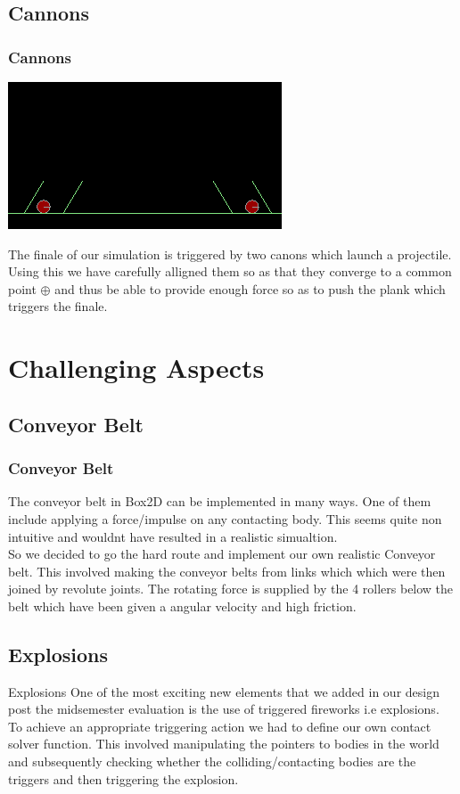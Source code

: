 \subsection{Cannons}
\begin{frame}
  \frametitle{Cannons}
  \begin{center}
  \includegraphics[scale=0.25]{./Images/Cannon00.png}
  \end{center}
The finale of our simulation is triggered by two canons which launch a projectile. Using this we have carefully alligned them so as that they converge to a common point $\oplus$ and thus be able to provide enough force so as to push the plank which triggers the finale.
\end{frame} 


\section{Challenging Aspects}
\subsection{Conveyor Belt}
\begin{frame}
\frametitle{Conveyor Belt}
The conveyor belt in Box2D can be implemented in many ways. \pause One of them include applying a force/impulse on any contacting body. \pause This seems quite non intuitive and wouldnt have resulted in a realistic simualtion. 
\\ 
\pause
So we decided to go the hard route and implement our own realistic Conveyor belt. This involved making the conveyor belts from links which which were then joined by revolute joints. The rotating force is supplied by the 4 rollers below the belt which have been given a angular velocity and high friction.
\end{frame}

\subsection{Explosions}
\begin{frame}{Explosions} 
One of the most exciting new elements that we added in our design post the midsemester evaluation is the use of triggered fireworks i.e explosions. 
\\ 
\pause
To achieve an appropriate triggering action we had to define our own contact solver function. This involved manipulating the pointers to bodies in the world and subsequently checking whether the colliding/contacting bodies are the triggers and then triggering the explosion.
\end{frame}

